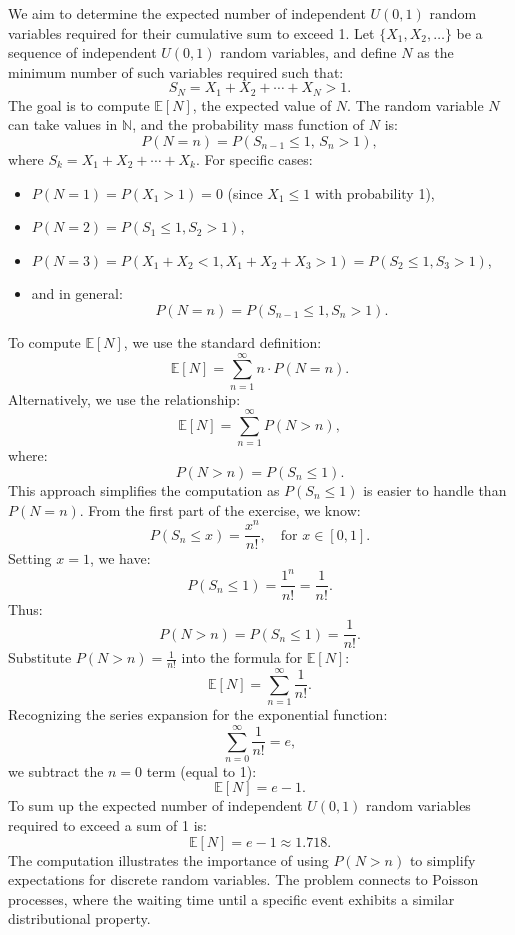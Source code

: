 We aim to determine the expected number of independent \( U(0, 1) \) random variables required for their cumulative sum to exceed 1. Let \( \{X_1, X_2, \dots\} \) be a sequence of independent \( U(0, 1) \) random variables, and define \( N \) as the minimum number of such variables required such that:
\[
S_N = X_1 + X_2 + \cdots + X_N > 1.
\]
The goal is to compute \( \mathbb{E}[N] \), the expected value of \( N \). \newline
The random variable \( N \) can take values in \( \mathbb{N} \), and the probability mass function of \( N \) is:
\[
P(N = n) = P(S_{n-1} \leq 1, \, S_n > 1),
\]
where \( S_k = X_1 + X_2 + \cdots + X_k \). \newline
For specific cases:
\begin{itemize}
    \item \( P(N = 1) = P(X_1 > 1) = 0 \) (since \( X_1 \leq 1 \) with probability 1),
    \item \( P(N = 2) = P(S_1 \leq 1, S_2 > 1) \),
    \item \( P(N = 3) = P(X_1 + X_2 < 1, X_1 + X_2 + X_3 > 1) = P(S_2 \leq 1, S_3 > 1) \),
    \item and in general:
\[
P(N = n) = P(S_{n-1} \leq 1, S_n > 1).
\]
\end{itemize}
To compute \( \mathbb{E}[N] \), we use the standard definition:
\[
\mathbb{E}[N] = \sum_{n=1}^\infty n \cdot P(N = n).
\]
Alternatively, we use the relationship:
\[
\mathbb{E}[N] = \sum_{n=1}^\infty P(N > n),
\]
where:
\[
P(N > n) = P(S_n \leq 1).
\]
This approach simplifies the computation as \( P(S_n \leq 1) \) is easier to handle than \( P(N = n) \). From the first part of the exercise, we know:
\[
P(S_n \leq x) = \frac{x^n}{n!}, \quad \text{for } x \in [0, 1].
\]
Setting \( x = 1 \), we have:
\[
P(S_n \leq 1) = \frac{1^n}{n!} = \frac{1}{n!}.
\]
Thus:
\[
P(N > n) = P(S_n \leq 1) = \frac{1}{n!}.
\]
Substitute \( P(N > n) = \frac{1}{n!} \) into the formula for \( \mathbb{E}[N] \):
\[
\mathbb{E}[N] = \sum_{n=1}^\infty \frac{1}{n!}.
\]
Recognizing the series expansion for the exponential function:
\[
\sum_{n=0}^\infty \frac{1}{n!} = e,
\]
we subtract the \( n = 0 \) term (equal to 1):
\[
\mathbb{E}[N] = e - 1.
\]
To sum up the expected number of independent \( U(0, 1) \) random variables required to exceed a sum of 1 is:
\[
\mathbb{E}[N] = e - 1 \approx 1.718.
\]
The computation illustrates the importance of using \( P(N > n) \) to simplify expectations for discrete random variables. The problem connects to Poisson processes, where the waiting time until a specific event exhibits a similar distributional property.



